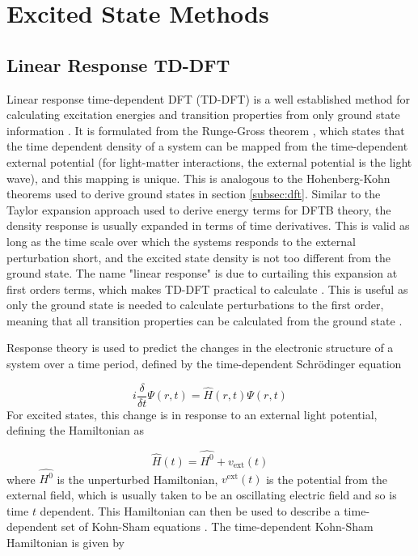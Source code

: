 \section{Excited State Methods}
\label{sec:response_theories}

\subsection{Linear Response TD-DFT}
\label{subsec:tddft}

Linear response time-dependent DFT (TD-DFT) is a well established method for calculating
excitation energies and transition properties from only ground state information \cite{Laurent2013}. 
It is formulated from the Runge-Gross theorem \cite{Runge1984}, which states that the
time dependent density of a system can be mapped from the time-dependent external 
potential (for light-matter interactions, the external potential is the light wave), 
and this mapping is unique. This is analogous to the Hohenberg-Kohn theorems used
to derive ground states in section \ref{subsec:dft}. Similar to the Taylor expansion
approach used to derive energy terms for DFTB theory, the density response is usually
expanded in terms of time derivatives. This is valid as long as the time scale over
which the systems responds to the external perturbation short, and the excited state
density is not too different from the ground state. The name "linear response" is
due to curtailing this expansion at first orders terms, which makes TD-DFT practical 
to calculate \cite{Marques2004}. This is useful as only the ground state is needed 
to calculate perturbations to the first order, meaning that all transition properties
can be calculated from the ground state \cite{Marques2004}.

Response theory is used to predict the changes in the electronic structure of a 
system over a time period, defined by the time-dependent Schr\"{o}dinger equation

\begin{equation}
    i \frac{\delta}{\delta t} \Psi\left(r, t\right) = \hat{H}\left(r, t\right) \Psi\left(r, t\right)
\end{equation}
%
For excited states, this change is in response to an external light potential, defining
the Hamiltonian as

\begin{equation}
\hat{H}\left(t\right) = \hat{H^0} + v_{\text{ext}}\left(t\right)
\end{equation}
%
where $\hat{H^0}$ is the unperturbed Hamiltonian, $v^{\text{ext}}\left(t\right)$ 
is the potential from the external field, which is usually taken to be an oscillating 
electric field and so is time $t$ dependent. This Hamiltonian can then be used to 
describe a time-dependent set of Kohn-Sham equations \cite{Kohn1964}. The time-dependent
Kohn-Sham Hamiltonian is given by

